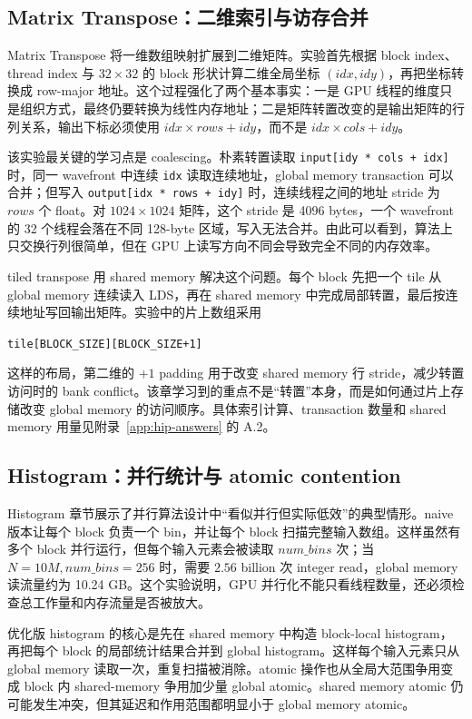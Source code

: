 \documentclass[10pt,a4paper]{article}
\begin{document}
\subsection{Matrix Transpose：二维索引与访存合并}

Matrix Transpose 将一维数组映射扩展到二维矩阵。实验首先根据 block index、thread index 与 $32\times32$ 的 block 形状计算二维全局坐标 $(idx,idy)$，再把坐标转换成 row-major 地址。这个过程强化了两个基本事实：一是 GPU 线程的维度只是组织方式，最终仍要转换为线性内存地址；二是矩阵转置改变的是输出矩阵的行列关系，输出下标必须使用 $idx\times rows+idy$，而不是 $idx\times cols+idy$。

该实验最关键的学习点是 coalescing。朴素转置读取 \texttt{input[idy * cols + idx]} 时，同一 wavefront 中连续 \texttt{idx} 读取连续地址，global memory transaction 可以合并；但写入 \texttt{output[idx * rows + idy]} 时，连续线程之间的地址 stride 为 $rows$ 个 float。对 $1024\times1024$ 矩阵，这个 stride 是 4096 bytes，一个 wavefront 的 32 个线程会落在不同 128-byte 区域，写入无法合并。由此可以看到，算法上只交换行列很简单，但在 GPU 上读写方向不同会导致完全不同的内存效率。

tiled transpose 用 shared memory 解决这个问题。每个 block 先把一个 tile 从 global memory 连续读入 LDS，再在 shared memory 中完成局部转置，最后按连续地址写回输出矩阵。实验中的片上数组采用
\begin{center}
\small\texttt{tile[BLOCK\_SIZE][BLOCK\_SIZE+1]}
\end{center}
这样的布局，第二维的 $+1$ padding 用于改变 shared memory 行 stride，减少转置访问时的 bank conflict。该章学习到的重点不是“转置”本身，而是如何通过片上存储改变 global memory 的访问顺序。具体索引计算、transaction 数量和 shared memory 用量见附录~\ref{app:hip-answers} 的 A.2。

\subsection{Histogram：并行统计与 atomic contention}

Histogram 章节展示了并行算法设计中“看似并行但实际低效”的典型情形。naive 版本让每个 block 负责一个 bin，并让每个 block 扫描完整输入数组。这样虽然有多个 block 并行运行，但每个输入元素会被读取 $num\_bins$ 次；当 $N=10M,num\_bins=256$ 时，需要 $2.56$ billion 次 integer read，global memory 读流量约为 10.24 GB。这个实验说明，GPU 并行化不能只看线程数量，还必须检查总工作量和内存流量是否被放大。

优化版 histogram 的核心是先在 shared memory 中构造 block-local histogram，再把每个 block 的局部统计结果合并到 global histogram。这样每个输入元素只从 global memory 读取一次，重复扫描被消除。atomic 操作也从全局大范围争用变成 block 内 shared-memory 争用加少量 global atomic。shared memory atomic 仍可能发生冲突，但其延迟和作用范围都明显小于 global memory atomic。
\end{document}
